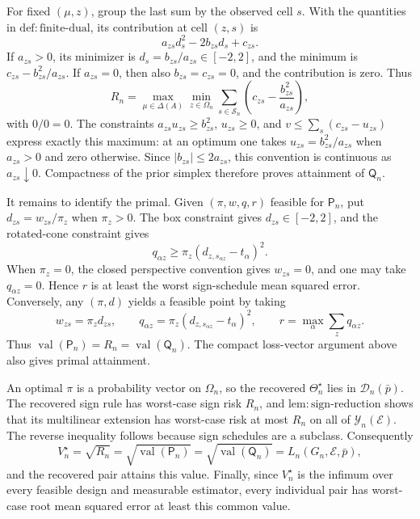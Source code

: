 For fixed \((\mu,z)\), group the last sum by the observed cell \(s\).  With the quantities in \(\mathrm{def{:}finite\text{-}dual}\), its contribution at cell \((z,s)\) is
\[
 a_{zs}d_s^2-2b_{zs}d_s+c_{zs}.
\]
If \(a_{zs}>0\), its minimizer is \(d_s=b_{zs}/a_{zs}\in[-2,2]\), and the minimum is \(c_{zs}-b_{zs}^2/a_{zs}\).  If \(a_{zs}=0\), then also \(b_{zs}=c_{zs}=0\), and the contribution is zero.  Thus
\[
 R_n=\max_{\mu\in\Delta(A)}\min_{z\in\Omega_n}
 \sum_{s\in\mathcal S_n}
 \left(c_{zs}-\frac{b_{zs}^2}{a_{zs}}\right),
\]
with \(0/0=0\).  The constraints \(a_{zs}u_{zs}\ge b_{zs}^2\), \(u_{zs}\ge0\), and
\(v\le\sum_s(c_{zs}-u_{zs})\) express exactly this maximum: at an optimum one takes \(u_{zs}=b_{zs}^2/a_{zs}\) when \(a_{zs}>0\) and zero otherwise.  Since \(|b_{zs}|\le2a_{zs}\), this convention is continuous as \(a_{zs}\downarrow0\).  Compactness of the prior simplex therefore proves attainment of \(\mathsf Q_n\).

It remains to identify the primal.  Given \((\pi,w,q,r)\) feasible for \(\mathsf P_n\), put \(d_{zs}=w_{zs}/\pi_z\) when \(\pi_z>0\).  The box constraint gives \(d_{zs}\in[-2,2]\), and the rotated-cone constraint gives
\[
 q_{\alpha z}\ge\pi_z(d_{z,s_{\alpha z}}-t_\alpha)^2.
\]
When \(\pi_z=0\), the closed perspective convention gives \(w_{zs}=0\), and one may take \(q_{\alpha z}=0\).  Hence \(r\) is at least the worst sign-schedule mean squared error.  Conversely, any \((\pi,d)\) yields a feasible point by taking
\[
 w_{zs}=\pi_zd_{zs},\qquad
 q_{\alpha z}=\pi_z(d_{z,s_{\alpha z}}-t_\alpha)^2,
 \qquad
 r=\max_\alpha\sum_zq_{\alpha z}.
\]
Thus \(\operatorname{val}(\mathsf P_n)=R_n=\operatorname{val}(\mathsf Q_n)\).  The compact loss-vector argument above also gives primal attainment.

An optimal \(\pi\) is a probability vector on \(\Omega_n\), so the recovered \(\Theta_n^\star\) lies in \(\mathcal D_n(\bar p)\).  The recovered sign rule has worst-case sign risk \(R_n\), and \(\mathrm{lem{:}sign\text{-}reduction}\) shows that its multilinear extension has worst-case risk at most \(R_n\) on all of \(\mathcal Y_n(\mathcal E)\).  The reverse inequality follows because sign schedules are a subclass.  Consequently
\[
 V_n^\star=\sqrt{R_n}
 =\sqrt{\operatorname{val}(\mathsf P_n)}
 =\sqrt{\operatorname{val}(\mathsf Q_n)}
 =L_n(G_n,\mathcal E,\bar p),
\]
and the recovered pair attains this value.  Finally, since \(V_n^\star\) is the infimum over every feasible design and measurable estimator, every individual pair has worst-case root mean squared error at least this common value.